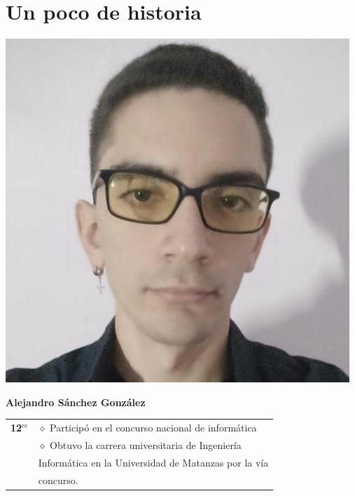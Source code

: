 \pagestyle{fancy}
\lhead{}
\chead{}
\chapter*{Un poco de historia}


\begin{minipage}{0.2\textwidth}
	\includegraphics[width=\linewidth]{img/concursantes/alejandro_sanchez.png} %
\end{minipage}
\hfill
\begin{minipage}{0.7\textwidth}
	\textbf{Alejandro Sánchez González}
	
	\vspace*{0.1in}
	\begin{longtable}{rl}
		\textbf{12$^{ce}$} & $\diamond$ Participó en el concurso nacional de informática\\
		& $\diamond$ Obtuvo la carrera universitaria de Ingeniería \\
		& Informática en la Universidad de Matanzas por la vía \\
		& concurso.
		
	\end{longtable}
	
\end{minipage}



